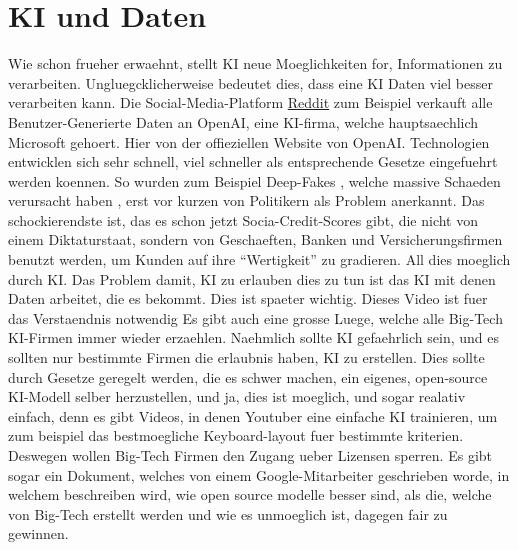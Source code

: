 \documentclass{report}
\begin{document}
\section{KI und Daten}
Wie schon frueher erwaehnt, stellt KI neue Moeglichkeiten for, Informationen zu verarbeiten. Ungluegcklicherweise bedeutet dies, dass eine KI Daten viel besser verarbeiten kann.
Die Social-Media-Platform \hyperlink{reddit.com}{Reddit} zum Beispiel verkauft alle Benutzer-Generierte Daten an OpenAI, eine KI-firma, welche hauptsaechlich Microsoft gehoert. \citep{openai-site}
Hier von der offieziellen Website von OpenAI. \citep{openai-reddit-deal}
\newline
\newline
Technologien entwicklen sich sehr schnell, viel schneller als entsprechende Gesetze eingefuehrt werden koennen. So wurden zum Beispiel Deep-Fakes \citep{deepfakes}, welche massive Schaeden verursacht haben \citep{deepfakes-scam}, erst vor kurzen von Politikern als Problem anerkannt.
\newline
\newline
Das schockierendste ist, das es schon jetzt Socia-Credit-Scores gibt, die nicht von einem Diktaturstaat, sondern von Geschaeften, Banken und Versicherungsfirmen benutzt werden, um Kunden auf ihre \enquote{Wertigkeit} zu gradieren. All dies moeglich durch KI.
Das Problem damit, KI zu erlauben dies zu tun ist das KI mit denen Daten arbeitet, die es bekommt. Dies ist spaeter wichtig.
\citep{ai-social-credit-scores} Dieses Video ist fuer das Verstaendnis notwendig
\newline
\newline
Es gibt auch eine grosse Luege, welche alle Big-Tech KI-Firmen immer wieder erzaehlen. Naehmlich sollte KI gefaehrlich sein, und es sollten nur bestimmte Firmen die erlaubnis haben, KI zu erstellen. Dies sollte durch Gesetze geregelt werden, die es schwer machen, ein eigenes, open-source KI-Modell selber herzustellen, und ja, dies ist moeglich, und sogar realativ einfach, denn es gibt Videos, in denen Youtuber eine einfache KI trainieren, um zum beispiel das bestmoegliche Keyboard-layout fuer bestimmte kriterien. Deswegen wollen Big-Tech Firmen den Zugang ueber Lizensen sperren. \citep{training-an-ai-model}
\newline
Es gibt sogar ein Dokument, welches von einem Google-Mitarbeiter geschrieben worde, in welchem beschreiben wird, wie open source modelle besser sind, als die, welche von Big-Tech erstellt werden und wie es unmoeglich ist, dagegen fair zu gewinnen. \citep{google-enginner-says-big-ai-sucks}
\end{document}
